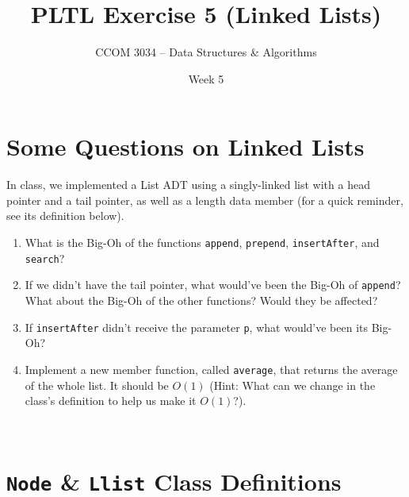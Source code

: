 \documentclass[11 pt]{article}
\title{PLTL Exercise 5 (Linked Lists)}
\author{CCOM 3034 – Data Structures \& Algorithms}
\date{Week 5}
\begin{document}
\maketitle



\section{Some Questions on Linked Lists}

In class, we implemented a List ADT using a singly-linked list with a head pointer and a tail pointer, as well as a length data member (for a quick reminder, see its definition below). 

\begin{enumerate}
    \item What is the Big-Oh of the functions \texttt{append}, \texttt{prepend}, \texttt{insertAfter}, and \texttt{search}?
    \item If we didn't have the tail pointer, what would've been the Big-Oh of \texttt{append}? What about the Big-Oh of the other functions? Would they be affected?
    \item If \texttt{insertAfter} didn't receive the parameter \texttt{p}, what would've been its Big-Oh?
    \item Implement a new member function, called \texttt{average}, that returns the average of the whole list. It should be $O(1)$ (Hint: What can we change in the class's definition to help us make it $O(1)$?).
\end{enumerate} \\

\section {\texttt{Node} \& \texttt{Llist} Class Definitions}

\end{document}
